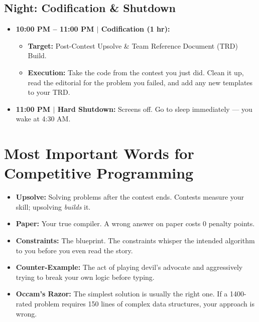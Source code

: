 \documentclass[12pt, a4paper]{article}
\begin{document}
\subsection{Night: Codification \& Shutdown}

\begin{itemize}[leftmargin=2em, itemsep=6pt]

  \item \textbf{10:00 PM -- 11:00 PM $|$ Codification (1 hr):}
    \begin{itemize}
      \item \textbf{Target:} Post-Contest Upsolve \& Team Reference Document
            (TRD) Build.
      \item \textbf{Execution:} Take the code from the contest you just did.
            Clean it up, read the editorial for the problem you failed, and add
            any new templates to your TRD.
    \end{itemize}

  \item \textbf{11:00 PM $|$ Hard Shutdown:} Screens off. Go to sleep
        immediately --- you wake at 4:30 AM.

\end{itemize}

\section{Most Important Words for Competitive Programming}

\begin{sidebarGray}
\begin{itemize}[leftmargin=1.5em, itemsep=6pt]

  \item \textbf{Upsolve:} Solving problems after the contest ends. Contests
        measure your skill; upsolving \emph{builds} it.

  \item \textbf{Paper:} Your true compiler. A wrong answer on paper costs
        0 penalty points.

  \item \textbf{Constraints:} The blueprint. The constraints whisper the
        intended algorithm to you before you even read the story.

  \item \textbf{Counter-Example:} The act of playing devil's advocate and
        aggressively trying to break your own logic before typing.

  \item \textbf{Occam's Razor:} The simplest solution is usually the right one.
        If a 1400-rated problem requires 150 lines of complex data structures,
        your approach is wrong.

\end{itemize}
\end{sidebarGray}
\end{document}
